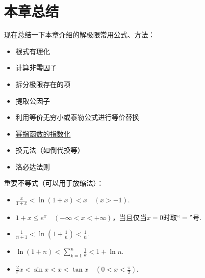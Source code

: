 \section{本章总结}
现在总结一下本章介绍的解极限常用公式、方法：
\begin{itemize}
	\item 根式有理化
	\item 计算非零因子
	\item 拆分极限存在的项
	\item 提取公因子
	\item 利用等价无穷小或泰勒公式进行等价替换
	\item \hyperref[theorem:幂指函数.幂指函数的极限]{幂指函数的指数化}
	\item 换元法（如倒代换等）
	\item 洛必达法则
\end{itemize}

重要不等式（可以用于放缩法）：
\begin{itemize}
	\item \(\frac{x}{1+x} < \ln(1+x) < x \quad(x>-1)\).%
	\item \(1+x \leq e^x \quad(-\infty<x<+\infty)\)，当且仅当\(x=0\)时取“\(=\)”号.
	\item \(\frac1{n+1} < \ln(1+\frac1n) < \frac1n\).
	\item \(\ln(1+n) < \sum_{k=1}^n \frac1{k} < 1 + \ln n\).
	\item \(\frac2\pi x < \sin x < x < \tan x \quad(0<x<\frac\pi2)\).
\end{itemize}

